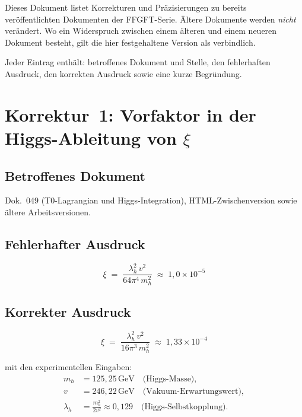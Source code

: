 \bigskip

Dieses Dokument listet Korrekturen und Präzisierungen zu bereits
veröffentlichten Dokumenten der FFGFT-Serie. Ältere Dokumente werden
\emph{nicht} verändert. Wo ein Widerspruch zwischen einem älteren und
einem neueren Dokument besteht, gilt die hier festgehaltene Version als
verbindlich.

Jeder Eintrag enthält: betroffenes Dokument und Stelle, den fehlerhaften
Ausdruck, den korrekten Ausdruck sowie eine kurze Begründung.

\section{\texorpdfstring{Korrektur~1: Vorfaktor in der Higgs-Ableitung von $\xi$}{Korrektur 1: Vorfaktor in der Higgs-Ableitung von xi}}

\subsection*{Betroffenes Dokument}

Dok.~049 (T0-Lagrangian und Higgs-Integration), HTML-Zwischenversion
sowie ältere Arbeitsversionen.

\subsection*{Fehlerhafter Ausdruck}

\begin{equation}
  \xi \;=\; \frac{\lambda_h^2\, v^2}{64\pi^4\, m_h^2}
  \;\approx\; 1{,}0 \times 10^{-5}
  \tag{alt -- falsch}
\end{equation}

\subsection*{Korrekter Ausdruck}

\begin{equation}
  \boxed{
    \xi \;=\; \frac{\lambda_h^2\, v^2}{16\pi^3\, m_h^2}
    \;\approx\; 1{,}33 \times 10^{-4}
  }
  \tag{190.1}
\end{equation}

mit den experimentellen Eingaben:
\begin{align*}
  m_h      &= 125{,}25\,\text{GeV} \quad \text{(Higgs-Masse)}, \\
  v        &= 246{,}22\,\text{GeV} \quad \text{(Vakuum-Erwartungswert)}, \\
  \lambda_h &= \frac{m_h^2}{2v^2} \approx 0{,}129
               \quad \text{(Higgs-Selbstkopplung)}.
\end{align*}

